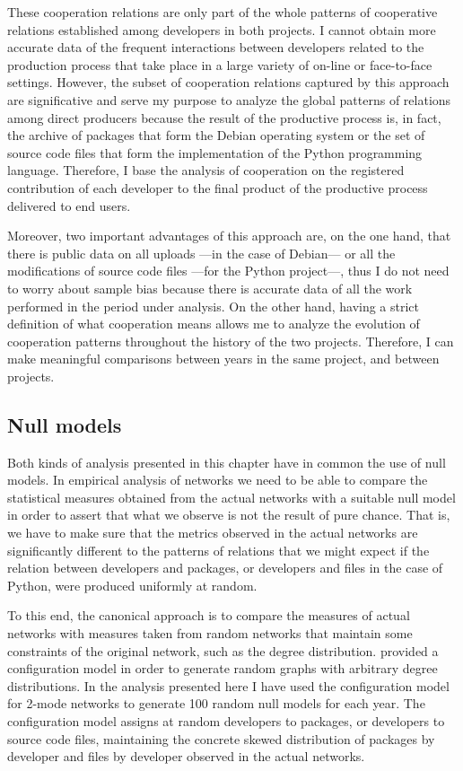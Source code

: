 These cooperation relations are only part of the whole patterns of cooperative relations established among developers in both projects. I cannot obtain more accurate data of the frequent interactions between developers related to the production process that take place in a large variety of on-line or face-to-face settings. However, the subset of cooperation relations captured by this approach are significative and serve my purpose to analyze the global patterns of relations among direct producers because the result of the productive process is, in fact, the archive of packages that form the Debian operating system or the set of source code files that form the implementation of the Python programming language. Therefore, I base the analysis of cooperation on the registered contribution of each developer to the final product of the productive process delivered to end users.

Moreover, two important advantages of this approach are, on the one hand, that there is public data on all uploads ---in the case of Debian--- or all the modifications of source code files ---for the Python project---, thus I do not need to worry about sample bias because there is accurate data of all the work performed in the period under analysis. On the other hand, having a strict definition of what cooperation means allows me to analyze the evolution of cooperation patterns throughout the history of the two projects. Therefore, I can make meaningful comparisons between years in the same project, and between projects.

\subsection{Null models}

Both kinds of analysis presented in this chapter have in common the use of null models. In empirical analysis of networks we need to be able to compare the statistical measures obtained from the actual networks with a suitable null model in order to assert that what we observe is not the result of pure chance. That is, we have to make sure that the metrics observed in the actual networks are significantly different to the patterns of relations that we might expect if the relation between developers and packages, or developers and files in the case of Python, were produced uniformly at random.

To this end, the canonical approach is to compare the measures of actual networks with measures taken from random networks that maintain some constraints of the original network, such as the degree distribution. \citet*{newman:2003,nsw:2001} provided a configuration model in order to generate random graphs with arbitrary degree distributions. In the analysis presented here I have used the configuration model for 2-mode networks to generate 100 random null models for each year. The configuration model assigns at random developers to packages, or developers to source code files, maintaining the concrete skewed distribution of packages by developer and files by developer observed in the actual networks.

